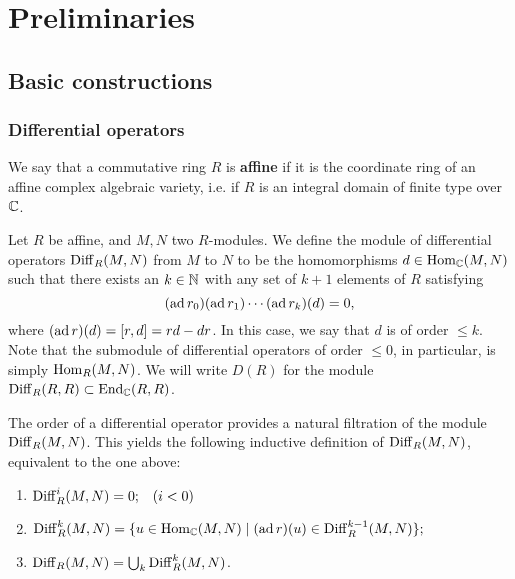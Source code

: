 \chapter{Preliminaries}


\section{Basic constructions}

\subsection{Differential operators}

\begin{definition}
    We say that a commutative ring $R$ is \textbf{affine} if it is
    the coordinate ring of an affine complex algebraic variety, i.e.
    if $R$ is an integral domain of finite type over $\mathbb{C}$.
\end{definition}

\begin{definition}
    Let $R$ be affine, and $M,N$ two $R$-modules.
    We define the module of
    differential operators $\operatorname{Diff}_R(M,N)$ from $M$ to $N$ to be the homomorphisms $d\in\operatorname{Hom}_{\mathbb{C}}(M,N)$
    such that there exists an $k\in\mathbb{N}$ with any set of $k+1$ elements of $R$ satisfying
    \begin{equation}
        (\operatorname{ad} r_0)(\operatorname{ad} r_1)\cdots(\operatorname{ad} r_k)(d)=0,
        \label{eq:ad}
    \end{equation}
    where $(\operatorname{ad} r)(d)=[r,d]=rd-dr$. In this case, we say that $d$ is of order $\leqslant k$.
    Note that the submodule of differential operators of order $\leqslant 0$, in particular,
    is simply $\operatorname{Hom}_R(M,N)$. We will write $D(R)$ for the module $\operatorname{Diff}_R(R,R)\subset\operatorname{End}_{\mathbb{C}}(R,R)$.
    \label{def:derivations}
\end{definition}

\begin{remark}
    The order of a differential operator provides a natural filtration of the module $\operatorname{Diff}_R(M,N)$.
    This yields the following inductive definition of $\operatorname{Diff}_R(M,N)$, equivalent to the one
    above: %
    \begin{enumerate}
        \item[] $\operatorname{Diff}^{i}_R(M,N) = 0; \;\;\;(i<0)$
        \item[] $\operatorname{Diff}^k_R(M,N) = \{u\in\operatorname{Hom}_{\mathbb{C}}(M,N)\mid (\operatorname{ad} r)(u)\in \operatorname{Diff}^{k-1}_R(M,N)\};$
        \item[] $\operatorname{Diff}_R(M,N)=\bigcup_k\operatorname{Diff}^k_R(M,N)$.
    \end{enumerate}
\end{remark}

